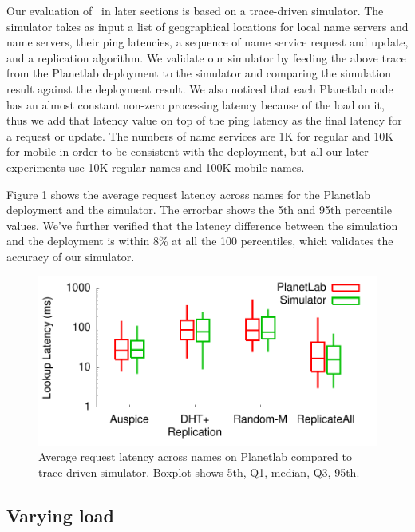 Our evaluation of \auspice\ in later sections is based on a trace-driven simulator. The simulator takes as input a list of geographical locations for local name servers and name servers, their ping latencies, a sequence of name service request and update, and a replication algorithm. We validate our simulator by feeding the above trace from the Planetlab deployment to the simulator and comparing the simulation result against the deployment result. We also noticed that each Planetlab node has an almost constant non-zero processing latency because of the load on it, thus we add that latency value on top of the ping latency as the final latency for a request or update. The numbers of name services are 1K for regular and 10K for mobile in order to be consistent with the deployment, but all our later experiments use 10K regular names and 100K mobile names.

Figure \ref{fig:simulatorval} shows the average request latency across names for the Planetlab deployment and the simulator. The errorbar shows the 5th and 95th percentile values. We've further verified that the latency difference between the simulation and the deployment is within 8\% at all the 100 percentiles, which validates the accuracy of our simulator.

\begin{figure}[t]
\centering
\includegraphics[scale=0.5]{graph/simulatorval1.pdf}
\caption{Average request latency across names on Planetlab compared to trace-driven simulator. Boxplot shows 5th, Q1, median, Q3, 95th.}
\label{fig:simulatorval}
\end{figure}


\subsection{Varying load}
\label{sim:load}

